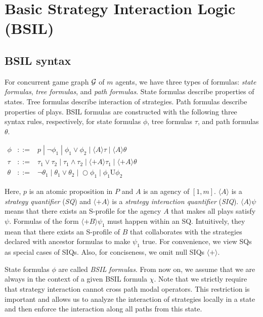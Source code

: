 \documentclass[11pt]{article}
\newcommand{\calg}{{\cal G}}
\newcommand{\until}{\textrm{U}} %
\newcommand{\nxt}{\bigcirc}
\begin{document}
\section{Basic Strategy Interaction Logic (BSIL) \label{sec.bsil}} 

\subsection{BSIL syntax \label{subsec.bsil.syntax}}

For concurrent game graph $\calg$ of $m$ agents, 
we have three types of formulas: {\em state formulas}, {\em tree formulas}, 
and {\em path formulas}.  
State formulas describe properties of states.  
Tree formulas describe interaction of strategies.  
Path formulas describe properties of plays.  
BSIL formulas are constructed with the following three syntax rules, 
respectively, for state formulas $\phi$, 
tree formulas $\tau$, and 
path formulas $\theta$.  
\begin{center}
$\begin{array}{rcl}
\phi    & ::= & p\;|\; \neg \phi_1 \;|\; \phi_1\vee \phi_2 
    \;|\; \langle  A\rangle \tau
    \;|\; \langle  A\rangle \theta
    \\
\tau  & ::= & \tau_1\vee \tau_2 \;|\; \tau_1\wedge \tau_2
    \;|\; \langle+ A\rangle \tau_1
    \;|\; \langle+ A\rangle\theta 
    \\
\theta  & ::= & \neg\theta_1 \;|\; \theta_1\vee \theta_2 
    \;|\; \nxt \phi_1
    \;|\; \phi_1\until \phi_2
\end{array}$
\end{center}
Here, $p$ is an atomic proposition in $P$ and
$A$ is an agency of $[1,m]$.
$\langle A\rangle$ is a {\em strategy quantifier} ({\em SQ}) and 
$\langle +A\rangle$ is a {\em strategy interaction quantifier} ({\em SIQ}).  
$\langle A\rangle\psi$ means that
there exists an S-profile for the agency $A$
that makes all plays satisfy $\psi$.
Formulas of the form $\langle+ B\rangle\psi_1$ must happen within an SQ.
Intuitively, they mean that there exists an S-profile of $B$
that collaborates with the strategies declared 
with ancestor formulas to make $\psi_1$ true. 
For convenience, we view SQs as special cases of SIQs. 
Also, for conciseness, we omit null SIQs $\langle+\rangle$.  
 \label{reply1.null.siq2} 

State formulas $\phi$ are called {\em BSIL} {\em formulas}. 
From now on, we assume that we are always in the context of 
a given BSIL formula $\chi$.  
Note that we strictly require that strategy interaction cannot 
cross path modal operators.  
This restriction is important and allows us to analyze the interaction 
of strategies locally in a state and 
then enforce the interaction along all paths from this state.  
\end{document}

